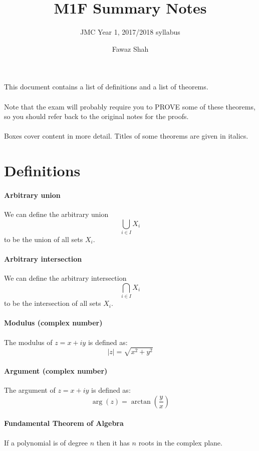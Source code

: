 \documentclass{scrartcl}
\title{M1F Summary Notes}
\subtitle{JMC Year 1, 2017/2018 syllabus}
\date{}
\author{Fawaz Shah}
\begin{document}
\large
\maketitle
\noindent This document contains a list of definitions and a list of theorems.
\\\\
Note that the exam will probably require you to PROVE some of these theorems, so you should refer back to the original notes for the proofs.
\\\\
Boxes cover content in more detail. Titles of some theorems are given in italics.
\tableofcontents
\newpage

\section{Definitions}
\paragraph{Arbitrary union}
We can define the arbitrary union
\begin{equation}
\bigcup_{i \in I} X_{i}
\end{equation}
to be the union of all sets $ X_{i} $.
\paragraph{Arbitrary intersection}
We can define the arbitrary intersection
\begin{equation}
\bigcap_{i \in I} X_{i}
\end{equation}
to be the intersection of all sets $ X_{i} $.
\paragraph{Modulus (complex number)}
The modulus of $ z = x + iy $ is defined as:
\begin{equation}
|z| = \sqrt{x^{2} + y^{2}}
\end{equation}
\paragraph{Argument (complex number)}
The argument of $ z = x + iy $ is defined as:
\begin{equation}
\arg(z) = \arctan(\frac{y}{x})
\end{equation}
\paragraph{Fundamental Theorem of Algebra}
If a polynomial is of degree $ n $ then it has $ n $ roots in the complex plane.
\end{document}
